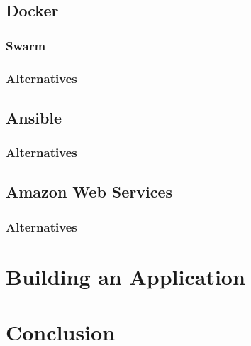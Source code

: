 \documentclass{article}
\begin{document}
\subsection{Docker}
\label{sub:Docker}

\subsubsection{Swarm}
\label{subs:Swarm}

\subsubsection{Alternatives}
\label{subs:Docker-alt}


\subsection{Ansible}
\label{sub:Ansible}

\subsubsection{Alternatives}
\label{subs:Ansible-alt}

\subsection{Amazon Web Services}
\label{sub:AWS}

\subsubsection{Alternatives}
\label{subs:AWS-alt}


\newpage
\section{Building an Application}
\label{sec:Build}

\newpage
\section{Conclusion}
\label{sec:Conclusion}

\newpage

\end{document}
